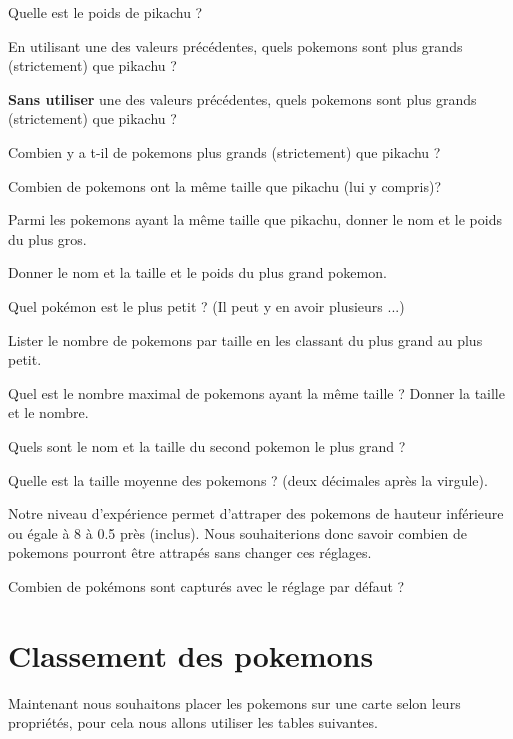 \question{}
Quelle est le poids de pikachu ?

\question{}
En utilisant une des valeurs précédentes, quels pokemons sont plus grands (strictement) que pikachu ?

\question{}
\textbf{Sans utiliser} une des valeurs précédentes, quels pokemons sont plus grands (strictement) que pikachu ?

\question{}
Combien y a t-il de pokemons plus grands (strictement) que pikachu ?

\question{}
Combien de pokemons ont la même taille que pikachu (lui y compris)? 

\question{}
Parmi les pokemons ayant la même taille que pikachu, donner le nom et le poids du plus gros. 


\question{}
Donner le nom et la taille et le poids du plus grand pokemon. 


\question{}
Quel pokémon est le plus petit ? (Il peut y en avoir plusieurs ...)


\question{}
Lister le nombre de pokemons par taille en les classant du plus grand au plus petit. 

\question{}
Quel est le nombre maximal de pokemons ayant la même taille ? 
Donner la taille et le nombre.

\question{}
Quels sont le nom et la taille du second pokemon le plus grand ? 

\question{}
Quelle est la taille moyenne des pokemons ? (deux décimales après la virgule).


Notre niveau d'expérience permet d'attraper des pokemons de hauteur inférieure ou égale à 8 à 0.5 près (inclus).
Nous souhaiterions donc savoir combien de pokemons pourront être attrapés sans changer ces réglages.

\question{}
 Combien de pokémons sont capturés avec le réglage par défaut ?

\section*{Classement des pokemons}
Maintenant nous souhaitons placer les pokemons sur une carte selon leurs propriétés, pour cela nous allons utiliser les tables suivantes.


